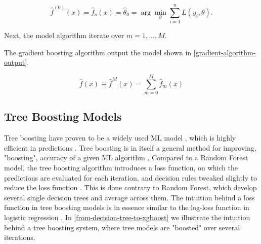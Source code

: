 \vspace{-1em}
\begin{equation}
\label{initial-gradient}
    \hat{f}^{(0)}(x)=\hat{f}_o(x)=\hat{\theta}_0=\arg\min_{\theta}\sum_{i=1}^{n}L(y_i,\theta). 
\end{equation}

Next, the model algorithm iterate over $m=1,...,M$.


The gradient boosting algorithm output the model shown in \autoref{gradient-algorithm-output}. 

\begin{equation}
\label{gradient-algorithm-output}
    \hat{f}(x)\equiv\hat{f}^{M}(x)=\sum_{m=0}^M\hat{f}_{m}(x)
\end{equation}





\subsection{Tree Boosting Models}

Tree boosting have proven to be a widely used ML model \parencite{xgboost-a-scaleable-tree-boosting-system}, which is highly efficient in predictions \parencite{ntnu-thesis-why-does-xgboost-win-every-machine-learning-competition}. Tree boosting is in itself a general method for improving, "boosting", accuracy of a given ML algorithm \parencite{schapire-a-brief-introduction-to-boosting}. Compared to a Random Forest model, the tree boosting algorithm introduces a loss function, on which the predictions are evaluated for each iteration, and decision rules tweaked slightly to reduce the loss function \parencite{schapire-a-brief-introduction-to-boosting}. This is done contrary to Random Forest, which develop several single decision trees and average across them. The intuition behind a loss function in tree boosting models is in essence similar to the log-loss function in logistic regression \parencite{friedman-additive-logistic-regression}. In \autoref{from-decision-tree-to-xgboost} we illustrate the intuition behind a tree boosting system, where tree models are "boosted" over several iterations. 


